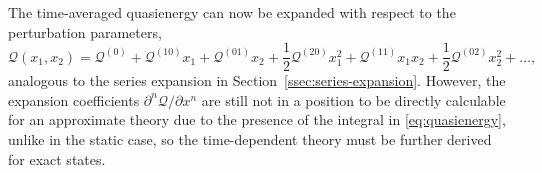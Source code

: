 \documentclass[%
class = book,%
crop = false,%
float = true,%
multi = true,%
preview = false,%
]{standalone}
\begin{document}
The time-averaged quasienergy can now be expanded with respect to the perturbation parameters,
\begin{equation}
  \label{eq:quasienergy-expansion} \tag{Toulouse eq. 51}
  \mathcal{Q}(x_{1},x_{2}) = \mathcal{Q}^{(0)} + \mathcal{Q}^{(10)}x_{1} + \mathcal{Q}^{(01)}x_{2} + \frac{1}{2}\mathcal{Q}^{(20)}x_{1}^{2} + \mathcal{Q}^{(11)}x_{1}x_{2} + \frac{1}{2}\mathcal{Q}^{(02)}x_{2}^{2} + \dots,
\end{equation}
analogous to the series expansion in Section~\ref{ssec:series-expansion}. However, the expansion coefficients \(\partial^{n}\mathcal{Q}/\partial x^{n}\) are still not in a position to be directly calculable for an approximate theory due to the presence of the integral in \eqref{eq:quasienergy}, unlike in the static case, so the time-dependent theory must be further derived for exact states.
\end{document}
